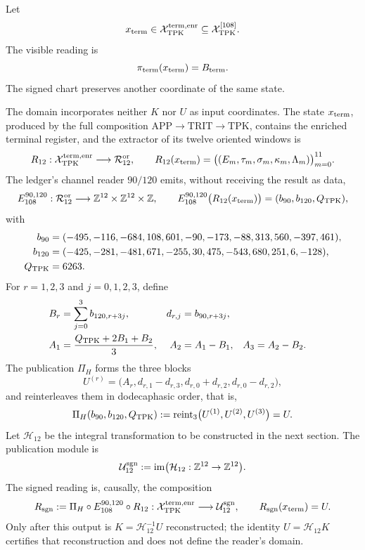 Let
\[
 x_{\rm term}\in
 \mathcal X_{\rm TPK}^{\rm term,enr}
 \subseteq\mathcal X_{\rm TPK}^{[108]}.
\]
The visible reading is
\[
 \pi_{\rm term}(x_{\rm term})=B_{\rm term}.
\]
The signed chart preserves another coordinate of the same state.

\begin{definition}
\label{p3-83-c25-s4:def:subespacio-firmado-terminal}
The domain incorporates neither \(K\) nor \(U\) as input coordinates. The
state \(x_{\rm term}\), produced by the full composition
\(\mathrm{APP}\to\mathrm{TRIT}\to\mathrm{TPK}\), contains the enriched
terminal register, and the extractor of its twelve oriented windows is
\begin{equation}
 R_{12}:\mathcal X_{\rm TPK}^{\rm term,enr}
 \longrightarrow\mathcal R_{12}^{\rm or},
 \qquad
 R_{12}(x_{\rm term})
 =\bigl((E_m,\tau_m,\sigma_m,\kappa_m,\Lambda_m)\bigr)_{m=0}^{11}.
 \label{p3-83-c25-s4:eq:subespacio-firmado-terminal}
\end{equation}
The ledger’s channel reader \(90/120\) emits, without receiving the result
as data,
\[
 E_{108}^{90,120}:\mathcal R_{12}^{\rm or}
 \longrightarrow\mathbb Z^{12}\times\mathbb Z^{12}\times\mathbb Z,
 \qquad
 E_{108}^{90,120}\bigl(R_{12}(x_{\rm term})\bigr)
 =(b_{90},b_{120},Q_{\rm TPK}),
\]
with
\begin{align*}
 b_{90}={}&(-495,-116,-684,108,601,-90,
             -173,-88,313,560,-397,461),\\
 b_{120}={}&(-425,-281,-481,671,-255,30,
              475,-543,680,251,6,-128),\\
 Q_{\rm TPK}={}&6263.
\end{align*}
For \(r=1,2,3\) and \(j=0,1,2,3\), define
\[
\begin{aligned}
 B_r&=\sum_{j=0}^{3}b_{120,r+3j},
 &d_{r,j}&=b_{90,r+3j},\\
 A_1&=\frac{Q_{\rm TPK}+2B_1+B_2}{3},
 &A_2&=A_1-B_1,
 &A_3&=A_2-B_2.
\end{aligned}
\]
The publication \(\Pi_H\) forms the three blocks
\[
 U^{(r)}=
 \bigl(A_r,d_{r,1}-d_{r,3},d_{r,0}+d_{r,2},
 d_{r,0}-d_{r,2}\bigr),
\]
and reinterleaves them in dodecaphasic order, that is,
\[
 \Pi_H(b_{90},b_{120},Q_{\rm TPK})
 :=\operatorname{reint}_3\bigl(U^{(1)},U^{(2)},U^{(3)}\bigr)=U.
\]
Let \(\mathcal H_{12}\) be the
integral transformation to be constructed in the next section. The publication
module is
\begin{equation}
 \mathcal U_{12}^{\rm sgn}
 :=\operatorname{im}
 \bigl(\mathcal H_{12}:\mathbb Z^{12}\to\mathbb Z^{12}\bigr).
 \label{p3-83-c25-s4:eq:modulo-publicacion-firmada}
\end{equation}
The signed reading is, causally, the composition
\begin{equation}
 R_{\rm sgn}:=
 \Pi_H\circ E_{108}^{90,120}\circ R_{12}:
 \mathcal X_{\rm TPK}^{\rm term,enr}
 \longrightarrow\mathcal U_{12}^{\rm sgn},
 \qquad
 R_{\rm sgn}(x_{\rm term})=U.
 \label{p3-83-c25-s4:eq:lector-firmado-terminal}
\end{equation}
Only after this output is
\(K=\mathcal H_{12}^{-1}U\) reconstructed; the identity
\(U=\mathcal H_{12}K\) certifies that reconstruction and does not define the reader’s
domain.
\end{definition}

